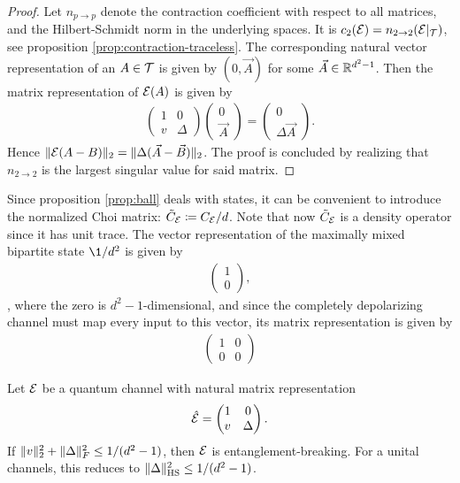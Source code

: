 \begin{proof} Let $n_{p\rightarrow p}$ denote the contraction coefficient with respect to all matrices, and the Hilbert-Schmidt norm in the underlying spaces. It is $c_2(\mathcal E) = n_{2 \rightarrow 2}(\mathcal E|_{\mathcal T})$, see proposition \ref{prop:contraction-traceless}. The corresponding natural vector representation of an $A \in \mathcal T$ is given by $(0,\vec A)$ for some $\vec A \in \mathbb{R}^{d^2-1}$. Then the matrix representation of $\mathcal E(A)$ is given by
    \begin{align*}
        \begin{pmatrix}
         1 & 0\\
        v & \Delta
    \end{pmatrix}\begin{pmatrix}
        0 \\ \vec A
    \end{pmatrix} = 
    \begin{pmatrix}
        0\\ \Delta \vec A
    \end{pmatrix}.
    \end{align*}
    Hence $\lVert\mathcal E(A-B)\rVert_2 = \lVert\Delta(\vec A-\vec B)\rVert_2$. The proof is concluded by realizing that $n_{2 \rightarrow 2}$ is the largest singular value for said matrix.
\end{proof}
Since proposition \ref{prop:ball} deals with states, it can be convenient to introduce the normalized Choi matrix: $\tilde C_{\mathcal E} \coloneqq C_{\mathcal E}/d$. Note that now $\tilde C_{\mathcal E}$ is a density operator since it has unit trace. The vector representation of the maximally mixed bipartite state $\1/{d^2}$ is given by 
    \begin{align}
        \begin{pmatrix}
            1 \\ 0
        \end{pmatrix},
    \end{align}
    , where the zero is $d^2-1$-dimensional, and since the completely depolarizing channel must map every input to this vector, its matrix representation is given by 
    \begin{align}
    \begin{pmatrix}
        1 & 0\\
        0 & 0
    \end{pmatrix}
    \end{align}
\begin{prop}\label{prop:contraction}
    Let $\mathcal E$ be a quantum channel with natural matrix representation 
    \begin{align*}
    \hat{\mathcal E}= \begin{pmatrix}
         1 & 0\\
        v & \Delta
    \end{pmatrix}.
    \end{align*} If $\lVert v\rVert_2^2 + \lVert\Delta\rVert_F^2 \leq 1/(d^2-1)$, then $\mathcal E$ is entanglement-breaking. For a unital channels, this reduces to $\lVert\Delta\rVert_\text{HS}^2 \leq 1/(d^2-1)$.
\end{prop}
